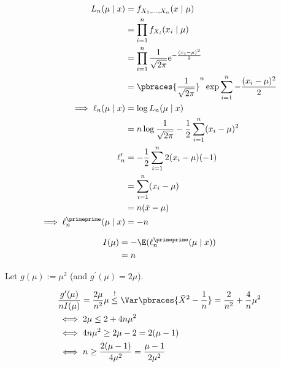 \begin{solution}
\begin{enumerate}[label = (\alph*)]
    \begin{align*}
        L_n(\mu \mid x)
        & =
        f_{X_1, \dots, X_n}(x \mid \mu) \\
        & =
        \prod_{i=1}^n f_{X_i}(x_i \mid \mu) \\
        & =
        \prod_{i=1}^n
            \frac{1}{\sqrt{2 \pi}}
            \mathrm e^{-\frac{(x_i - \mu)^2}{2}} \\
        & =
        \pbraces
        {
            \frac{1}{\sqrt{2 \pi}}
        }^n
        \exp
            \sum_{i=1}^n
                -\frac{(x_i - \mu)^2}{2} \\
        \implies
        \ell_n(\mu \mid x)
        & =
        \log L_n(\mu \mid x) \\
        & =
        n \log \frac{1}{\sqrt{2 \pi}}
        -
        \frac{1}{2}
        \sum_{i=1}^n
            (x_i - \mu)^2 \\
        \ell_n^\prime
        & =
        -\frac{1}{2}
        \sum_{i=1}^n
            2 (x_i - \mu) (-1) \\
        & =
        \sum_{i=1}^n
            (x_i - \mu) \\
        & =
        n (\bar x - \mu) \\
        \implies
        \ell_n^\primeprime(\mu \mid x)
        & =
        -n
    \end{align*}

    \begin{align*}
        I(\mu)
        & =
        -\E(\ell_n^\primeprime(\mu \mid x)) \\
        & =
        n
    \end{align*}

    Let $g(\mu) := \mu^2$ (and $g^\prime(\mu) = 2 \mu$).

    \begin{align*}
        &
        \frac{g^\prime(\mu)}{n I(\mu)}
        =
        \frac{2 \mu}{n^2} \mu
        \stackrel{!}{\leq}
        \Var \pbraces{\bar X^2 - \frac{1}{n}}
        =
        \frac{2}{n^2} + \frac{4}{n} \mu^2 \\
        & \iff
        2 \mu \leq 2 + 4 n \mu^2 \\
        & \iff
        4 n \mu^2 \geq 2 \mu - 2 = 2 (\mu - 1) \\
        & \iff
        n \geq \frac{2 ( \mu - 1)}{4 \mu^2} = \frac{\mu - 1}{2 \mu^2}
    \end{align*}

\end{enumerate}

\end{solution}

